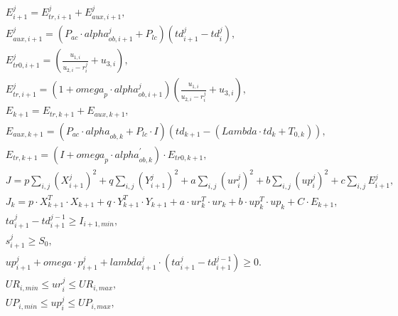 \begin{align}
  & E_{i + 1}^{j} = E_{\mathit{tr} , i + 1}^{j} + E_{\mathit{aux} , i + 1}^{j} , \tag{eq\_0014} \\
  & E_{\mathit{aux} , i + 1}^{j} = \left(P_{\mathit{ac}} \cdot \mathit{alpha}_{\mathit{ob} , i + 1}^{j} + P_{\mathit{lc}}\right) \left(\mathit{td}_{i + 1}^{j} - \mathit{td}_{i}^{j}\right) , \tag{eq\_0015} \\
  & E_{\mathit{tr} 0 , i + 1}^{j} = \left(\frac{u_{1 , i}}{u_{2 , i} - r_{i}^{j}} + u_{3 , i}\right) , \tag{eq\_0016} \\
  & E_{\mathit{tr} , i + 1}^{j} = \left(1 + \mathit{omega}_{p} \cdot \mathit{alpha}_{\mathit{ob} , i + 1}^{j}\right) \left(\frac{u_{1 , i}}{u_{2 , i} - r_{i}^{j}} + u_{3 , i}\right) , \tag{eq\_0017} \\
  & E_{k + 1} = E_{\mathit{tr} , k + 1} + E_{\mathit{aux} , k + 1} , \tag{eq\_0018} \\
  & E_{\mathit{aux} , k + 1} = \left(P_{\mathit{ac}} \cdot \mathit{alpha}_{\mathit{ob} , k} + P_{\mathit{lc}} \cdot I\right) \left(\mathit{td}_{k + 1} - \left(\mathit{Lambda} \cdot \mathit{td}_{k} + T_{0 , k}\right)\right) , \tag{eq\_0019} \\
  & E_{\mathit{tr} , k + 1} = \left(I + \mathit{omega}_{p} \cdot \mathit{alpha}_{\mathit{ob} , k}^{'}\right) \cdot E_{\mathit{tr} 0 , k + 1} , \tag{eq\_0020} \\
  & J = p \sum_{i , j} \left(X_{i + 1}^{j}\right)^{2} + q \sum_{i , j} \left(Y_{i + 1}^{j}\right)^{2} + a \sum_{i , j} \left(\mathit{ur}_{i}^{j}\right)^{2} + b \sum_{i , j} \left(\mathit{up}_{i}^{j}\right)^{2} + c \sum_{i , j} E_{i + 1}^{j} , \tag{eq\_0021} \\
  & J_{k} = p \cdot X_{k + 1}^{T} \cdot X_{k + 1} + q \cdot Y_{k + 1}^{T} \cdot Y_{k + 1} + a \cdot \mathit{ur}_{k}^{T} \cdot \mathit{ur}_{k} + b \cdot \mathit{up}_{k}^{T} \cdot \mathit{up}_{k} + C \cdot E_{k + 1} , \tag{eq\_0022} \\
  & \mathit{ta}_{i + 1}^{j} - \mathit{td}_{i + 1}^{j - 1} \geq I_{i + 1 , min} , \tag{eq\_0023} \\
  & s_{i + 1}^{j} \geq S_{0} , \tag{eq\_0024} \\
  & \mathit{up}_{i + 1}^{j} + \mathit{omega} \cdot p_{i + 1}^{j} + \mathit{lambda}_{i + 1}^{j} \cdot \left(\mathit{ta}_{i + 1}^{j} - \mathit{td}_{i + 1}^{j - 1}\right) \geq 0 . \tag{eq\_0025} \\
  & \mathit{UR}_{i , min} \leq \mathit{ur}_{i}^{j} \leq \mathit{UR}_{i , max} , \tag{eq\_0026} \\
  & \mathit{UP}_{i , min} \leq \mathit{up}_{i}^{j} \leq \mathit{UP}_{i , max} , \tag{eq\_0027} \\

\end{align}
